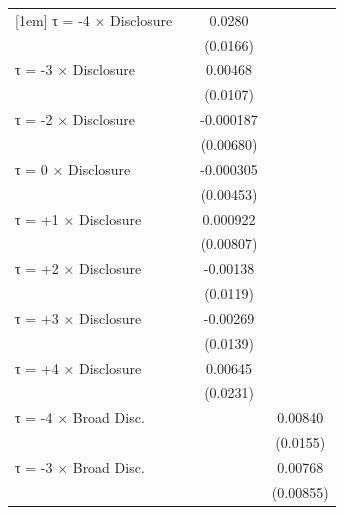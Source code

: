 \begin{table}[htbp]
\begin{tabular}{l*{3}{c}}
[1em]
τ = -4 × Disclosure &                     &      0.0280\sym{*}  &                     \\
                    &                     &    (0.0166)         &                     \\
[1em]
τ = -3 × Disclosure &                     &     0.00468         &                     \\
                    &                     &    (0.0107)         &                     \\
[1em]
τ = -2 × Disclosure &                     &   -0.000187         &                     \\
                    &                     &   (0.00680)         &                     \\
[1em]
τ = 0 × Disclosure  &                     &   -0.000305         &                     \\
                    &                     &   (0.00453)         &                     \\
[1em]
τ = +1 × Disclosure &                     &    0.000922         &                     \\
                    &                     &   (0.00807)         &                     \\
[1em]
τ = +2 × Disclosure &                     &    -0.00138         &                     \\
                    &                     &    (0.0119)         &                     \\
[1em]
τ = +3 × Disclosure &                     &    -0.00269         &                     \\
                    &                     &    (0.0139)         &                     \\
[1em]
τ = +4 × Disclosure &                     &     0.00645         &                     \\
                    &                     &    (0.0231)         &                     \\
[1em]
τ = -4 × Broad Disc.&                     &                     &     0.00840         \\
                    &                     &                     &    (0.0155)         \\
[1em]
τ = -3 × Broad Disc.&                     &                     &     0.00768         \\
                    &                     &                     &   (0.00855)         \\

\end{tabular}
\end{table}
